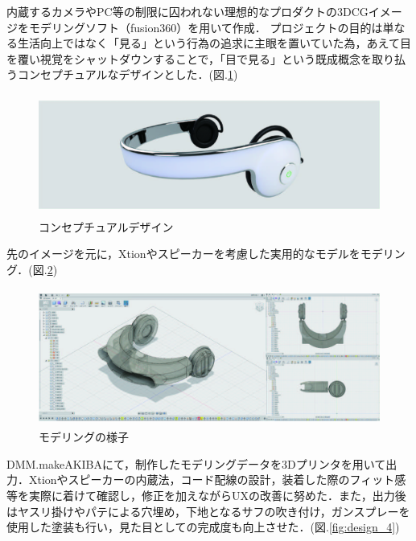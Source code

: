 内蔵するカメラやPC等の制限に囚われない理想的なプロダクトの3DCGイメージをモデリングソフト（fusion360）を用いて作成．
プロジェクトの目的は単なる生活向上ではなく「見る」という行為の追求に主眼を置いていた為，あえて目を覆い視覚をシャットダウンすることで，「目で見る」という既成概念を取り払うコンセプチュアルなデザインとした．(図.\ref{fig:design_2})


\begin{figure}[h]
\begin{center}
\includegraphics[height=40mm]{images/hardware/design_2.jpg}
\end{center}
\caption{コンセプチュアルデザイン}
\label{fig:design_2}
\end{figure}

先のイメージを元に，Xtionやスピーカーを考慮した実用的なモデルをモデリング．(図.\ref{fig:design_3})

\begin{figure}[h]
\begin{center}
\includegraphics[height=45mm]{images/hardware/design_3.jpg}
\end{center}
\caption{モデリングの様子}
\label{fig:design_3}
\end{figure}

DMM.makeAKIBAにて，制作したモデリングデータを3Dプリンタを用いて出力．Xtionやスピーカーの内蔵法，コード配線の設計，装着した際のフィット感等を実際に着けて確認し，修正を加えながらUXの改善に努めた．また，出力後はヤスリ掛けやパテによる穴埋め，下地となるサフの吹き付け，ガンスプレーを使用した塗装も行い，見た目としての完成度も向上させた．(図.\ref{fig:design_4})

